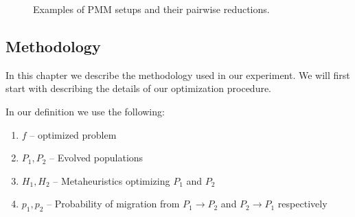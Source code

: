 \documentclass{sig-alternate}
\begin{document}
\begin{figure}[htp]
{
    }

    \caption{Examples of PMM setups and their pairwise reductions.}
    \label{fig:setups}
    \end{figure}

\subsection{Methodology}
    In this chapter we describe the methodology used in our experiment.
    We will first start with describing the details of our optimization procedure.

    In our definition we use the following:
    \begin{enumerate}
        \item $f$ -- optimized problem
        \item $P_1, P_2$ -- Evolved populations
        \item $H_1, H_2$ -- Metaheuristics optimizing $P_1$ and $P_2$
        \item $p_1, p_2$ -- Probability of migration from $P_1 \rightarrow P_2$ and $P_2 \rightarrow P_1$ respectively

    \end{enumerate}
\end{document}
